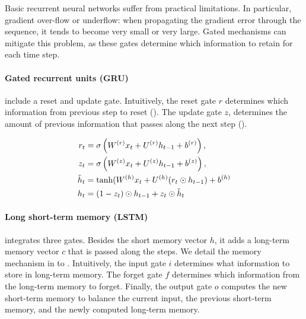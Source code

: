 Basic recurrent neural networks suffer from practical limitations. In particular, gradient over-flow or underflow: when propagating the gradient error through the sequence, it tends to become very small or very large. Gated mechanisms can mitigate this problem, as these gates determine which information to retain for each time step.


\paragraph{Gated recurrent units (GRU)} include a reset and update gate. Intuitively, the reset gate $r$ determines which information from previous step to reset (). The update gate $z$, determines the amount of previous information that passes along the next step ().

\begin{align}
r_t &= \sigma \left( W^{(r)} x_t + U^{(r)} h_{t-1} + b^{(r)} \right), \labeq{gru-def-first}\\
z_t &= \sigma \left( W^{(z)} x_t + U^{(z)} h_{t-1} + b^{(z)} \right), \\
\tilde{h}_t &= \tanh(W^{(h)} x_t + U^{(h)} (r_t \odot h_{t-1}) + b^{(h)} \labeq{gru-def-reset} \\
h_t &= (1-z_t) \odot h_{t-1} + z_t \odot \tilde{h}_t  \labeq{gru-def-last}
\end{align}


\paragraph{Long short-term memory (LSTM)} integrates three gates. Besides the short memory vector $h$, it adds a long-term memory vector $c$ that is passed along the steps. We detail the memory mechanism in  to . Intuitively, the input gate $i$ determines what information to store in long-term memory. The forget gate $f$ determines which information from the long-term memory to forget. Finally, the output gate $o$ computes the new short-term memory to balance the current input, the previous short-term memory, and the newly computed long-term memory.

